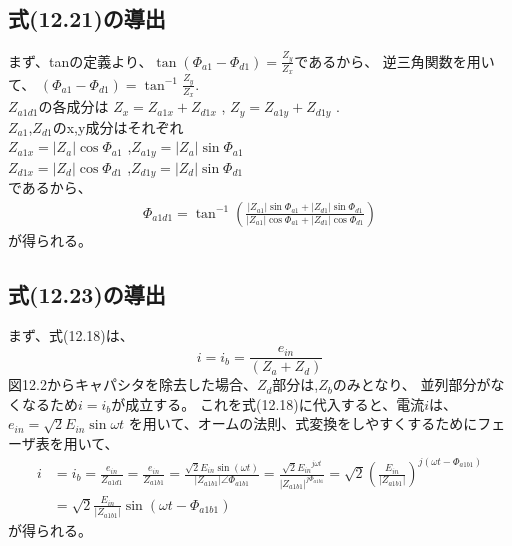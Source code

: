 \documentclass[fleqn,11pt,a4paper,dvipdfmx]{jsarticle}
\numberwithin{equation}{section}
\begin{document}
\newpage
\subsection*{式(12.21)の導出}
まず、tanの定義より、$\tan\left(\Phi_{a1} - \Phi_{d1}\right) = \frac{Z_y}{Z_x}$であるから、
逆三角関数を用いて、
$\left(\Phi_{a1} - \Phi_{d1}\right) = \tan^{-1}\frac{Z_y}{Z_x}$.\\
$Z_{a1d1}$の各成分は
$Z_x = Z_{a1x} + Z_{d1x}$ , $Z_y = Z_{a1y} + Z_{d1y}$ .\\
$Z_{a1}$,$Z_{d1}$のx,y成分はそれぞれ\\
$Z_{a1x} = \left|Z_a\right| \cos \Phi_{a1}$ ,$Z_{a1y} = \left|Z_a\right| \sin \Phi_{a1}$\\
$Z_{d1x} = \left|Z_d\right| \cos \Phi_{d1}$ ,$Z_{d1y} = \left|Z_d\right| \sin \Phi_{d1}$\\
であるから、
\begin{align*}
  \Phi_{a1d1} = \tan^{-1}\left( \frac{\left| Z_{a1} \right| \sin \Phi_{a1} + \left| Z_{d1} \right| \sin \Phi_{d1} }{\left| Z_{a1} \right| \cos \Phi_{a1} + \left| Z_{d1} \right| \cos \Phi_{d1}}\right)
\end{align*}
が得られる。

\subsection*{式(12.23)の導出}
まず、式(12.18)は、
\begin{equation*}
  i = i_b = \frac{e_{in}}{\left(Z_a + Z_d\right)}
\end{equation*}
図12.2からキャパシタを除去した場合、$Z_d$部分は,$Z_b$のみとなり、
並列部分がなくなるため$i = i_b$が成立する。
これを式(12.18)に代入すると、電流$i$は、
$e_{in} = \sqrt{2}E_{in}\sin \omega t$
を用いて、オームの法則、式変換をしやすくするためにフェーザ表を用いて、
\begin{align*}
  i & = i_b = \frac{e_{in}}{Z_{a1d1}} = \frac{e_{in}}{Z_{a1b1}} = \frac{\sqrt{2}E_{in}\sin \left(\omega t\right)}{\left|Z_{a1b1}\right| \angle \Phi_{a1b1}}
  = \frac{ \sqrt{2}{E_{in}}^{j \omega t} }{\left| Z_{a1b1} \right|^{j\Phi_{a1b1}}} = \sqrt{2} {\left(\frac{E_{in}}{\left|Z_{a1b1}\right|}\right)}^{j \left(\omega t - \Phi_{a1b1}\right)} \\
    & = \sqrt{2} \frac{ E_{in} }{\left| Z_{a1b1} \right|}\sin \left(\omega t - \Phi_{a1b1}\right)
\end{align*}
が得られる。
\end{document}
